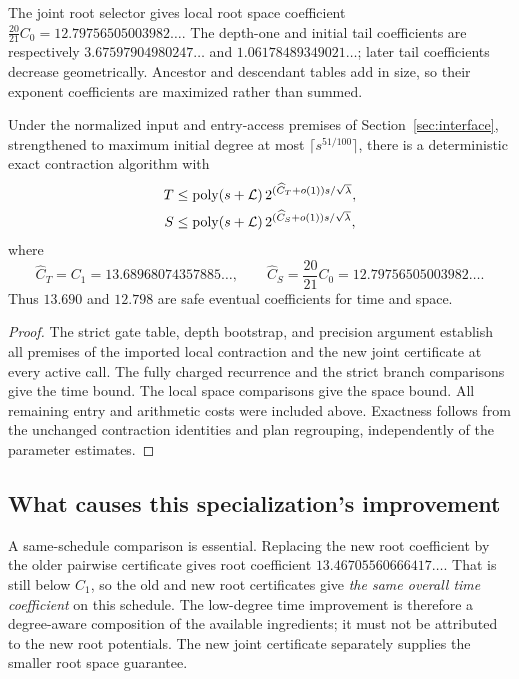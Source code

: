 The joint root selector gives local root space coefficient
$\frac{20}{21}C_0=12.79756505003982\ldots$.
The depth-one and initial tail coefficients are respectively
$3.67597904980247\ldots$ and $1.06178489349021\ldots$; later tail
coefficients decrease geometrically. Ancestor and descendant tables add
in size, so their exponent coefficients are maximized rather than summed.

\begin{theorem}\label{thm:low-degree}
Under the normalized input and entry-access premises of
Section~\ref{sec:interface}, strengthened to maximum initial degree at most
$\lceil s^{51/100}\rceil$, there is a deterministic exact contraction algorithm
with
\begin{align*}
 T&\le\operatorname{poly}(s+\mathcal L)\,
       2^{(\widehat C_T+o(1))s/\sqrt\lambda},\\
 S&\le\operatorname{poly}(s+\mathcal L)\,
       2^{(\widehat C_S+o(1))s/\sqrt\lambda},
\end{align*}
where
\[
 \widehat C_T=C_1=13.68968074357885\ldots,
 \qquad
 \widehat C_S=\frac{20}{21}C_0=12.79756505003982\ldots.
\]
Thus $13.690$ and $12.798$ are safe eventual coefficients for time and space.
\end{theorem}
\begin{proof}
The strict gate table, depth bootstrap, and precision argument establish all
premises of the imported local contraction and the new joint certificate
at every active call. The fully charged recurrence and the strict branch
comparisons give the time bound. The local space comparisons give the
space bound. All remaining entry and arithmetic costs were included above.
Exactness follows from the unchanged contraction identities and plan
regrouping, independently of the parameter estimates.
\end{proof}

\subsection{What causes this specialization's improvement}

A same-schedule comparison is essential. Replacing the new root coefficient
by the older pairwise certificate gives root coefficient
$13.46705560666417\ldots$. That is still below $C_1$, so the old and new
root certificates give \emph{the same overall time coefficient} on this
schedule. The low-degree time improvement is therefore a degree-aware
composition of the available ingredients; it must not be attributed to
the new root potentials. The new joint certificate separately supplies the
smaller root space guarantee.

